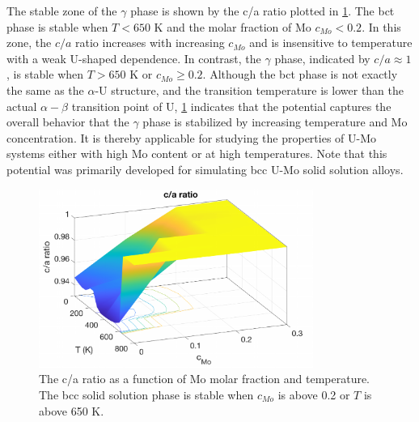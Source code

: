 \documentclass[review]{elsarticle}
\begin{document}
The stable zone of the $\gamma$ phase is shown by the c/a ratio plotted in \cref{fig:c_a_ratio}. The bct phase is stable when $T<650$ K and the molar fraction of Mo $c_{Mo}<0.2$. In this zone, the $c/a$ ratio increases with increasing $c_{Mo}$ and is insensitive to temperature with a weak U-shaped dependence. In contrast, the $\gamma$ phase, indicated by $c/a\approx1$, is stable when $T>650$ K or $c_{Mo}\geq0.2$. Although the bct phase is not exactly the same as the $\alpha$-U structure, and the transition temperature is lower than the actual $\alpha-\beta$ transition point of U, \cref{fig:c_a_ratio} indicates that the potential captures the overall behavior that the $\gamma$ phase is stabilized by increasing temperature and Mo concentration. It is thereby applicable for studying the properties of U-Mo systems either with high Mo content or at high temperatures. Note that this potential was primarily developed for simulating bcc U-Mo solid solution alloys.


\begin{figure}[h!]
 \centering
 \includegraphics[width=0.8\textwidth]{c_a} 
 \caption{The c/a ratio as a function of Mo molar fraction and temperature. The bcc solid solution phase is stable when $c_{Mo}$ is above 0.2 or $T$ is above 650 K. }
 \label{fig:c_a_ratio}
\end{figure}
\end{document}
